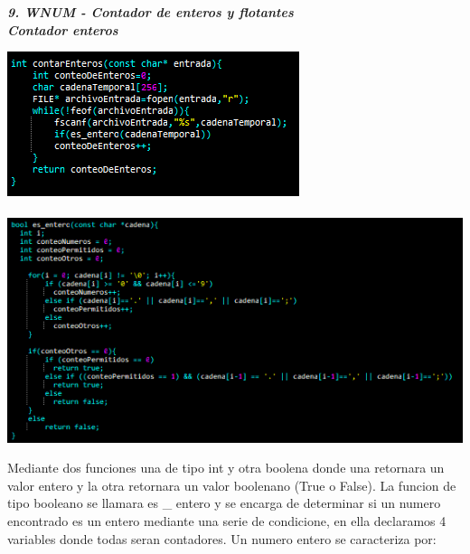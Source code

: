\documentclass[12pt,letterpaper]{report}
\begin{document}
\newpage
\textbf{\textit{ 9. WNUM - Contador de enteros y flotantes}}\\

\textbf{\textit{\em{Contador enteros}}}
\begin{multicols}{2}

\includegraphics[scale=0.8]{punto9-1}\\\\
\includegraphics[scale=0.6]{punto9-11}\\

\end{multicols}
Mediante dos funciones una de tipo int y otra boolena donde una retornara un valor entero y la otra retornara un valor boolenano (True o False). 
La funcion de tipo booleano se llamara es \_ entero y se encarga de determinar si un numero encontrado es un entero mediante una serie de condicione, en ella declaramos 4 variables donde todas seran contadores. Un numero entero se caracteriza por: 
\end{document}
